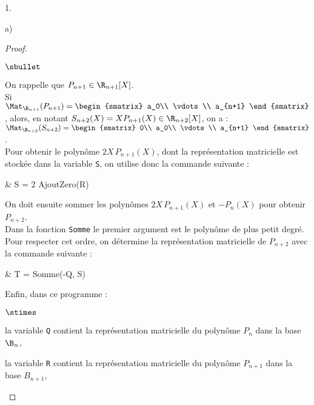 \documentclass[11pt]{article}%
\begin{document}
\begin{exerciceAP}
\begin{noliste}{1.}
\begin{noliste}{a)}
\begin{proof}
\begin{noliste}{$\sbullet$}
          \item On rappelle que $P_{n+1} \in \R_{n+1}[X]$. \\
            Si $\Mat_{\B_{n+1}}(P_{n+1}) =
            \begin{smatrix}
              a_0\\
              \vdots\\
              a_{n+1}
            \end{smatrix}$, alors, en notant $S_{n+2}(X) = X P_{n+1}(X)
            \in \R_{n+2}[X]$,
            on a : $\Mat_{\B_{n+2}}(S_{n+2}) =
            \begin{smatrix}
              0\\
              a_0\\
              \vdots\\
              a_{n+1}
            \end{smatrix}$.\\
            Pour obtenir le polynôme $2X \, P_{n+1}(X)$, dont la
            représentation matricielle est stockée dans la variable
            {\tt S}, on utilise
            donc la commande suivante :
            \begin{scilabC}{4}
              & \quad \quad S = 2 \Sfois{} AjoutZero(R)
            \end{scilabC}
            

            \newpage

          
          \item On doit ensuite sommer les polynômes $2X \,
            P_{n+1}(X)$ et $-P_n(X)$ pour obtenir $P_{n+2}$.\\
            Dans la fonction {\tt Somme} le premier argument est le
            polynôme de plus petit degré. Pour respecter cet ordre, on
            détermine la représentation matricielle de $P_{n+2}$ avec
            la commande suivante :
            \begin{scilabC}{5}
              & \quad \quad T = Somme(-Q, S)
            \end{scilabC}
          
          \item Enfin, dans ce programme :
            \begin{noliste}{$\stimes$}
            \item la variable {\tt Q} contient la représentation
              matricielle du polynôme $P_n$ dans la base $\B_n$,
              
            \item la variable {\tt R} contient la représentation
              matricielle du polynôme $P_{n+1}$ dans la base
              $B_{n+1}$,
              

\end{noliste}
\end{noliste}
\end{proof}
\end{noliste}
\end{noliste}
\end{exerciceAP}
\end{document}
